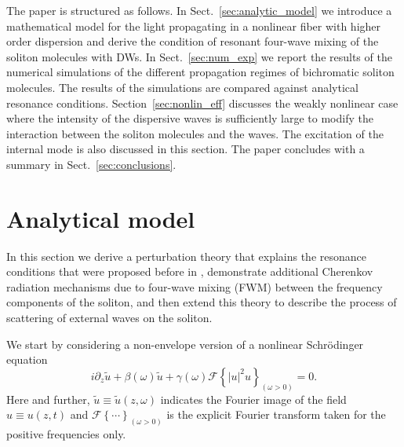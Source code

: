 \documentclass[aps, pra, twocolumn, superscriptaddress, final]{revtex4}
\newcommand{\abs}[1]{\left| #1 \right|}
\begin{document}
The paper is structured as follows.
In Sect.~\ref{sec:analytic_model} we introduce a mathematical model for the
light propagating in a nonlinear fiber with higher order dispersion and derive
the condition of resonant four-wave mixing of the soliton molecules with DWs.
In Sect.~\ref{sec:num_exp} we report the results of the numerical simulations
of the different propagation regimes of bichromatic soliton molecules. The
results of the simulations are compared against analytical resonance
conditions.
Section~\ref{sec:nonlin_eff} discusses the weakly nonlinear case where the
intensity of the dispersive waves is sufficiently large to modify the
interaction between the soliton molecules and the waves.  The excitation of the
internal mode is also discussed in this section.
The paper concludes with a summary in Sect.~\ref{sec:conclusions}.

\section{Analytical model\label{sec:analytic_model}}%

In this section we derive a perturbation theory that explains the resonance
conditions that were proposed before in \cite{PhysRevLett.123.243905},
demonstrate additional Cherenkov radiation mechanisms due to four-wave mixing
(FWM) between the frequency components of the soliton, and then extend this
theory to describe the process of scattering of external waves on the soliton.

We start by considering a non-envelope version of a nonlinear Schr\"odinger
equation~\cite{amiranashvili2010hamiltonian}
\begin{equation}
  \label{eq:GNLSE}
  i \partial_{z} \tilde u
    + \beta(\omega) \tilde u
    + \gamma(\omega) \mathcal{F} \left\{
      \abs{u}^{2} u
    \right\}_{(\omega > 0)} = 0.
\end{equation}
Here and further, $\tilde{u}\equiv \tilde{u}(z,\omega)$ indicates the Fourier
image of the field $u\equiv u(z,t)$ and $\mathcal{F}\left\{ \cdots
\right\}_{(\omega > 0)}$ is the explicit Fourier transform taken for the positive
frequencies only.
\end{document}
